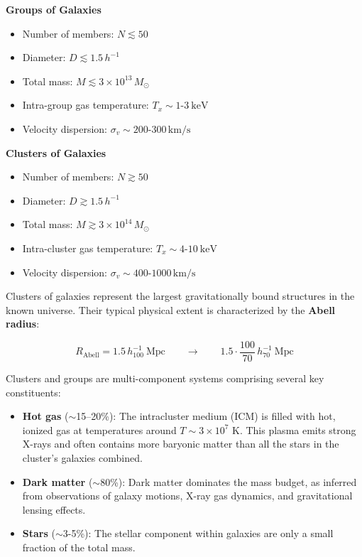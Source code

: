 \begin{minipage}{0.49\textwidth}
    \textbf{Groups of Galaxies}
    \begin{itemize}
        \item Number of members: $N \lesssim 50$
        \item Diameter: $D \lesssim 1.5\, h^{-1}$
        \item Total mass: $M \lesssim 3 \times 10^{13}\, M_{\odot}$
        \item Intra-group gas temperature: $T_x \sim 1 \text{-} 3\ \mathrm{keV}$
        \item Velocity dispersion: $\sigma_v \sim 200 \text{-} 300\, \mathrm{km/s}$
    \end{itemize}
\end{minipage}%
\hfill
\begin{minipage}{0.49\textwidth}
    \textbf{Clusters of Galaxies}
    \begin{itemize}
        \item Number of members: $N \gtrsim 50$
        \item Diameter: $D \gtrsim 1.5\, h^{-1}$
        \item Total mass: $M \gtrsim 3 \times 10^{14}\, M_{\odot}$
        \item Intra-cluster gas temperature: $T_x \sim 4 \text{-} 10\ \mathrm{keV}$
        \item Velocity dispersion: $\sigma_v \sim 400 \text{-} 1000\, \mathrm{km/s}$
    \end{itemize}
\end{minipage}

\vspace{0.7em}

Clusters of galaxies represent the largest gravitationally bound structures in the known universe. Their typical physical extent is characterized by the \textbf{Abell radius}:

$$
    R_{\mathrm{Abell}} = 1.5\, h_{100}^{-1} \ \mathrm{Mpc}
    \qquad \rightarrow \qquad
    1.5 \cdot \frac{100}{70}\, h_{70}^{-1} \ \mathrm{Mpc}
$$

Clusters and groups are multi-component systems comprising several key constituents:
\begin{itemize}
    \item \textbf{Hot gas} ($\sim$15–20\%): The intracluster medium (ICM) is filled with hot, ionized gas at temperatures around $T \sim 3 \times 10^7$ K. This plasma emits strong X-rays and often contains more baryonic matter than all the stars in the cluster's galaxies combined.
    \item \textbf{Dark matter} ($\sim$80\%): Dark matter dominates the mass budget, as inferred from observations of galaxy motions, X-ray gas dynamics, and gravitational lensing effects.
    \item \textbf{Stars} ($\sim$3-5\%): The stellar component within galaxies are only a small fraction of the total mass.
\end{itemize}

